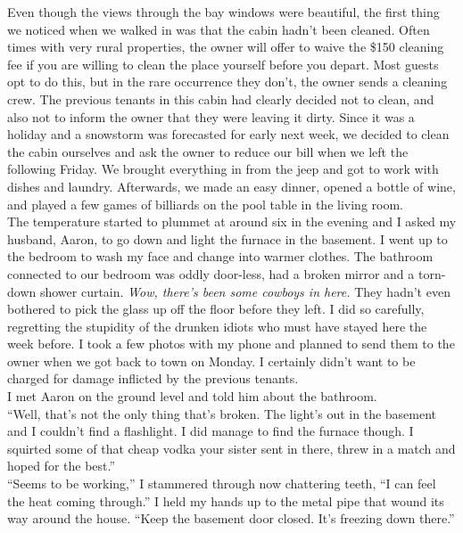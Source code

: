 \documentclass[a5paper]{scrartcl}
\begin{document}
Even though the views through the bay windows were beautiful, the first thing we noticed when we walked in was that the cabin hadn't been cleaned. Often times with very rural properties, the owner will offer to waive the \$150 cleaning fee if you are willing to clean the place yourself before you depart. Most guests opt to do this, but in the rare occurrence they don't, the owner sends a cleaning crew.  The previous tenants in this cabin had clearly decided not to clean, and also not to inform the owner that they were leaving it dirty. 
Since it was a holiday and a snowstorm was forecasted for early next week, we decided to clean the cabin ourselves and ask the owner to reduce our bill when we left the following Friday. We brought everything in from the jeep and got to work with dishes and laundry. Afterwards, we made an easy dinner, opened a bottle of wine, and played a few games of billiards on the pool table in the living room. \\


The temperature started to plummet at around six in the evening and I asked my husband, Aaron, to go down and light the furnace in the basement. I went up to the bedroom to wash my face and change into warmer clothes. The bathroom connected to our bedroom was oddly door-less, had a broken mirror and a torn-down shower curtain. \textit{Wow, there's been some cowboys in here.}
 They hadn't even bothered to pick the glass up off the floor before they left. I did so carefully, regretting the stupidity of the drunken idiots who must have stayed here the week before. I took a few photos with my phone and planned to send them to the owner when we got back to town on Monday. I certainly didn't want to be charged for damage inflicted by the previous tenants. \\


I met Aaron on the ground level and told him about the bathroom. \\


\enquote{Well, that's not the only thing that's broken. The light's out in the basement and I couldn't find a flashlight. I did manage to find the furnace though.  I squirted some of that cheap vodka your sister sent in there, threw in a match and hoped for the best.}\\


\enquote{Seems to be working,} I stammered through now chattering teeth, \enquote{I can feel the heat coming through.} I held my hands up to the metal pipe that wound its way around the house.
\enquote{Keep the basement door closed. It's freezing down there.}\\
\end{document}
